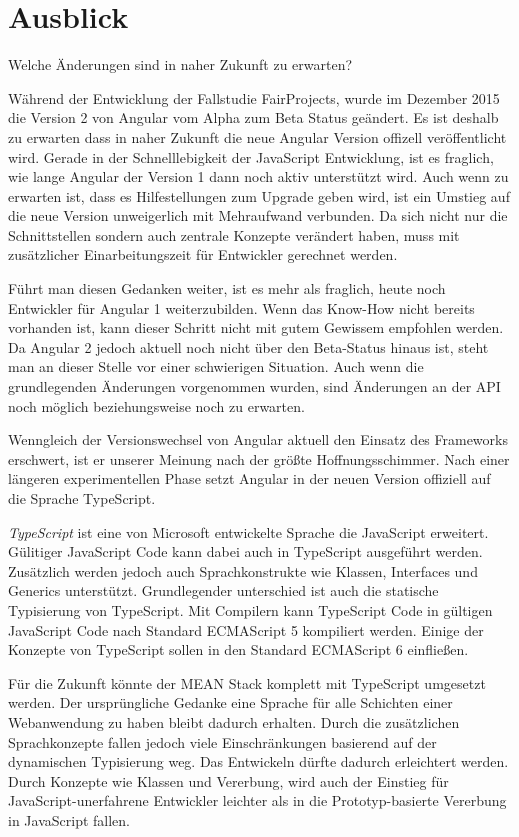 \chapter{Ausblick}\label{ausblick-marinus}

Welche Änderungen sind in naher Zukunft zu erwarten?

Während der Entwicklung der Fallstudie FairProjects, wurde im Dezember
2015 die Version 2 von Angular vom Alpha zum Beta Status geändert. Es
ist deshalb zu erwarten dass in naher Zukunft die neue Angular Version
offizell veröffentlicht wird. Gerade in der Schnelllebigkeit der
JavaScript Entwicklung, ist es fraglich, wie lange Angular der Version 1
dann noch aktiv unterstützt wird. Auch wenn zu erwarten ist, dass es
Hilfestellungen zum Upgrade geben wird, ist ein Umstieg auf die neue
Version unweigerlich mit Mehraufwand verbunden. Da sich nicht nur die
Schnittstellen sondern auch zentrale Konzepte verändert haben, muss mit
zusätzlicher Einarbeitungszeit für Entwickler gerechnet werden.

Führt man diesen Gedanken weiter, ist es mehr als fraglich, heute noch
Entwickler für Angular 1 weiterzubilden. Wenn das Know-How nicht bereits
vorhanden ist, kann dieser Schritt nicht mit gutem Gewissem empfohlen
werden. Da Angular 2 jedoch aktuell noch nicht über den Beta-Status
hinaus ist, steht man an dieser Stelle vor einer schwierigen Situation.
Auch wenn die grundlegenden Änderungen vorgenommen wurden, sind
Änderungen an der API noch möglich beziehungsweise noch zu erwarten.

Wenngleich der Versionswechsel von Angular aktuell den Einsatz des
Frameworks erschwert, ist er unserer Meinung nach der größte
Hoffnungsschimmer. Nach einer längeren experimentellen Phase setzt
Angular in der neuen Version offiziell auf die Sprache TypeScript.

\emph{TypeScript} ist eine von Microsoft entwickelte Sprache die
JavaScript erweitert. Gülitiger JavaScript Code kann dabei auch in
TypeScript ausgeführt werden. Zusätzlich werden jedoch auch
Sprachkonstrukte wie Klassen, Interfaces und Generics unterstützt.
Grundlegender unterschied ist auch die statische Typisierung von
TypeScript. Mit Compilern kann TypeScript Code in gültigen JavaScript
Code nach Standard ECMAScript 5 kompiliert werden. Einige der Konzepte
von TypeScript sollen in den Standard ECMAScript 6 einfließen.

Für die Zukunft könnte der MEAN Stack komplett mit TypeScript umgesetzt
werden. Der ursprüngliche Gedanke eine Sprache für alle Schichten einer
Webanwendung zu haben bleibt dadurch erhalten. Durch die zusätzlichen
Sprachkonzepte fallen jedoch viele Einschränkungen basierend auf der
dynamischen Typisierung weg. Das Entwickeln dürfte dadurch erleichtert
werden. Durch Konzepte wie Klassen und Vererbung, wird auch der Einstieg
für JavaScript-unerfahrene Entwickler leichter als in die
Prototyp-basierte Vererbung in JavaScript fallen.
